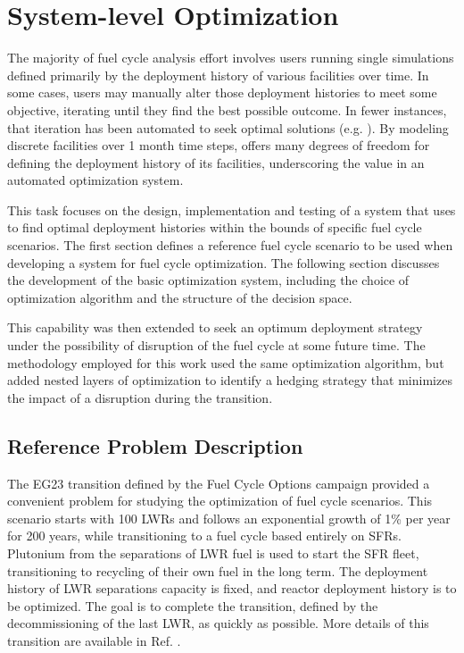 \section{System-level Optimization}\label{section:system}

The majority of fuel cycle analysis effort involves users running single
simulations defined primarily by the deployment history of various facilities
over time.  In some cases, users may manually alter those deployment histories
to meet some objective, iterating until they find the best possible outcome.
In fewer instances, that iteration has been automated to seek optimal
solutions (e.g. ).  By modeling discrete facilities over 1 month time
steps, \Cyclus{} offers many degrees of freedom for defining the deployment
history of its facilities, underscoring the value in an automated optimization
system.

This task focuses on the design, implementation and testing of a system that
uses \Cyclus{} to find optimal deployment histories within the bounds of
specific fuel cycle scenarios.  The first section defines a reference fuel
cycle scenario to be used when developing a system for fuel cycle
optimization.  The following section discusses the development of the basic
optimization system, including the choice of optimization algorithm and the
structure of the decision space.

This capability was then extended to seek an optimum deployment strategy under
the possibility of disruption of the fuel cycle at some future time.  The
methodology employed for this work used the same optimization algorithm, but
added nested layers of optimization to identify a hedging strategy that
minimizes the impact of a disruption during the transition.

\subsection{Reference Problem Description}

The EG23 transition defined by the Fuel Cycle Options campaign provided a
convenient problem for studying the optimization of fuel cycle scenarios.
This scenario starts with 100 \gls{LWR}s and follows an exponential growth of
  1\% per year for 200 years, while transitioning to a fuel cycle based
  entirely on \gls{SFR}s.  Plutonium from the separations of \gls{LWR} fuel is
  used to start the \gls{SFR} fleet, transitioning to recycling of their own
  fuel in the long term.  The deployment history of \gls{LWR} separations
  capacity is fixed, and reactor deployment history is to be optimized.  The
  goal is to complete the transition, defined by the decommissioning of the
  last \gls{LWR}, as quickly as possible.  More details of this transition are
  available in Ref. .


